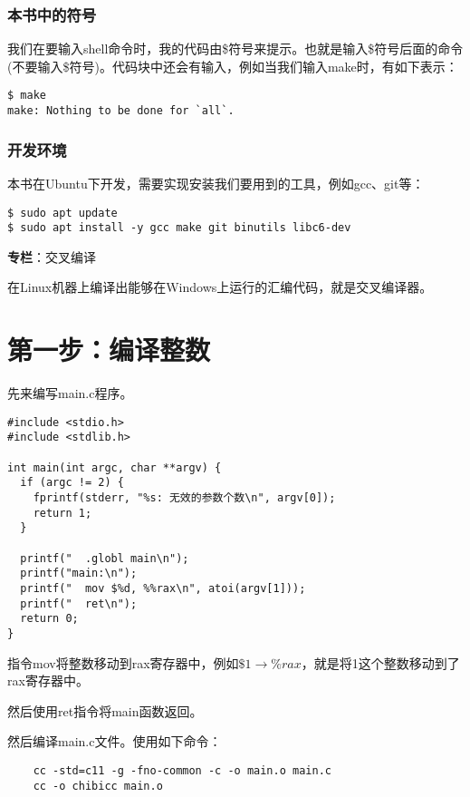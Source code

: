 \documentclass[cn,10pt,math=newtx,citestyle=gb7714-2015,bibstyle=gb7714-2015]{elegantbook}
\begin{document}
\subsection{本书中的符号}
    我们在要输入shell命令时，我的代码由\$符号来提示。也就是输入\$符号后面的命令(不要输入\$符号)。代码块中还会有输入，例如当我们输入make时，有如下表示：

\begin{verbatim}
$ make
make: Nothing to be done for `all`.
\end{verbatim}

\subsection{开发环境}

本书在Ubuntu下开发，需要实现安装我们要用到的工具，例如gcc、git等：

\begin{verbatim}
$ sudo apt update
$ sudo apt install -y gcc make git binutils libc6-dev
\end{verbatim}

\begin{tcolorbox}
\textbf{专栏}：交叉编译

在Linux机器上编译出能够在Windows上运行的汇编代码，就是交叉编译器。
\end{tcolorbox}

\chapter{第一步：编译整数}

先来编写main.c程序。

\begin{verbatim}
#include <stdio.h>
#include <stdlib.h>

int main(int argc, char **argv) {
  if (argc != 2) {
    fprintf(stderr, "%s: 无效的参数个数\n", argv[0]);
    return 1;
  }

  printf("  .globl main\n");
  printf("main:\n");
  printf("  mov $%d, %%rax\n", atoi(argv[1]));
  printf("  ret\n");
  return 0;
}
\end{verbatim}

指令mov将整数移动到rax寄存器中，例如$\$1 \rightarrow \%rax$，就是将1这个整数移动到了rax寄存器中。

然后使用ret指令将main函数返回。

然后编译main.c文件。使用如下命令：

\begin{verbatim}
    cc -std=c11 -g -fno-common -c -o main.o main.c
    cc -o chibicc main.o
\end{verbatim}
\end{document}
